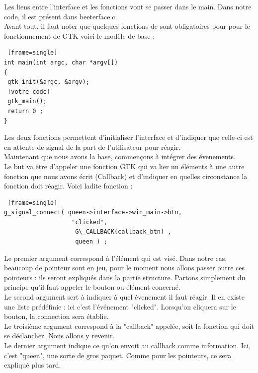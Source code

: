 \documentclass[11pt,french,a4paper]{report}
\begin{document}
Les liens entre l'interface et les fonctions vont se passer dans le main. Dans notre code, il est présent dans beeterface.c.\\

Avant tout, il faut noter que quelques fonctions de sont obligatoires pour pour le fonctionnement de GTK voici le modèle de base : \\

\begin{lstlisting} [frame=single]
int main(int argc, char *argv[])     
{ 
 gtk_init(&argc, &argv); 
 [votre code] 
 gtk_main();
 return 0 ;
} 
\end{lstlisting}
Les deux fonctions permettent d'initialiser l'interface et d'indiquer que celle-ci est en attente de signal
de la part de l'utilisateur pour réagir. \\

Maintenant que nous avons la base, commençons à intégrer des évenements. \\
Le but va être d'appeler une fonction GTK qui va lier un éléments à une autre fonction que nous avons écrit  (Callback) 
et d'indiquer en quelles circonstance la fonction doit réagir. Voici ladite fonction : \\

\begin{lstlisting} [frame=single]
g_signal_connect( queen->interface->win_main->btn,
                   "clicked", 
                    G\_CALLBACK(callback_btn) ,
                    queen ) ; 
\end{lstlisting}
Le premier argument correspond à l'élément qui est visé. Dans notre cas, beaucoup de pointeur sont en jeu,
pour le moment nous allons passer outre ces pointeurs : ils seront expliqués dans la partie structure. 
Partons simplement du principe qu'il faut appeler le bouton ou élément concerné.  \\

Le second argument sert à indiquer à quel évenement il faut réagir. Il en existe une liste prédéfinie : ici
c'est l'événement "clicked". Lorsqu'on cliquera sur le bouton, la connection sera établie. \\

Le troisième argument correspond à la "callback" appelée, soit la fonction qui doit se déclancher. Nous allons 
y revenir. \\

Le dernier argument indique ce qu'on envoit au callback comme information. Ici, c'est "queen", une sorte de 
gros paquet. Comme pour les pointeurs, ce sera expliqué plus tard. \\
\end{document}

